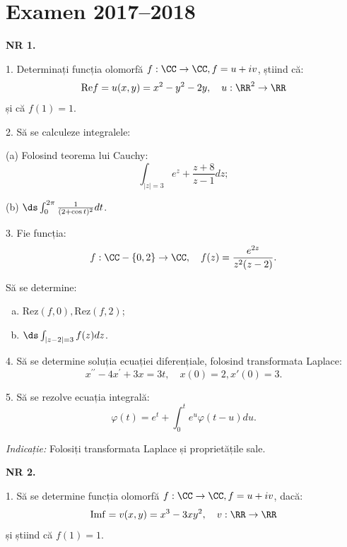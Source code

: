 
\chapter{Examen 2017--2018}

\indent\indent \textbf{NR 1.}

1. Determinați funcția olomorfă $ f : \CC \to \CC, f = u + iv$, știind că:
\[
  \mathrm{Re}f = u(x, y) = x^2 - y^2 - 2y, \quad u : \RR^2 \to \RR
\]
și că $ f(1) = 1 $.

\vspace{0.3cm}

2. Să se calculeze integralele:

(a) Folosind teorema lui Cauchy:
\[
  \int_{|z| = 3} e^z + \frac{z + 8}{z-1} dz;
\]

(b) $ \ds\int_0^{2\pi} \frac{1}{(2 + \cos t)^2} dt $.

\vspace{0.3cm}

3. Fie funcția:
\[
  f : \CC - \{0, 2\} \to \CC, \quad f(z) = \frac{e^{2z}}{z^2(z - 2)}.
\]

Să se determine:
\begin{enumerate}[(a)]
\item $ \mathrm{Rez}(f, 0), \mathrm{Rez}(f, 2) $;
\item $ \ds\int_{|z - 2| = 3} f(z) dz $.
\end{enumerate}

\vspace{0.3cm}

4. Să se determine soluția ecuației diferențiale, folosind transformata Laplace:
\[
  x^{\prime\prime} - 4x^\prime + 3x = 3t, \quad x(0) = 2, x'(0) = 3.
\]

\vspace{0.3cm}

5. Să se rezolve ecuația integrală:
\[
  \varphi(t) = e^t + \int_0^t e^u \varphi(t - u) du.
\]

\emph{Indicație:} Folosiți transformata Laplace și proprietățile sale.

\vspace{1cm}

\textbf{NR 2.}

1. Să se determine funcția olomorfă $ f : \CC \to \CC, f = u + iv$, dacă:
\[
  \mathrm{Imf} = v(x, y) = x^3 - 3xy^2, \quad v : \RR \to \RR
\]
și știind că $ f(1) = 1 $.

\vspace{0.3cm}


